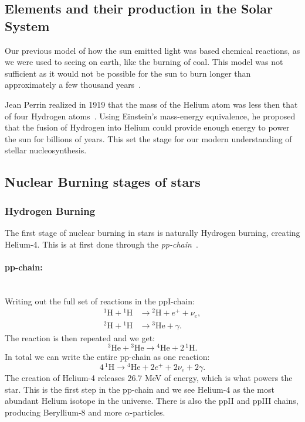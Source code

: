 \documentclass[english, notitlepage]{article}
\begin{document}
\subsection{Elements and their production in the Solar System}
Our previous model of how the sun emitted light was based chemical reactions, as we were used to seeing on earth, like the burning of coal. This model was not sufficient as it would not be possible for the sun to burn longer than approximately a few thousand years~\cite{gorgen:presentations}.

Jean Perrin realized in 1919 that the mass of the Helium atom was less then that of four Hydrogen atoms~\cite{gorgen:presentations}. Using Einstein's mass-energy equivalence, he proposed that the fusion of Hydrogen into Helium could provide enough energy to power the sun for billions of years. This set the stage for our modern understanding of stellar nucleosynthesis. 



\subsection{Nuclear Burning stages of stars}
\subsubsection{Hydrogen Burning}
The first stage of nuclear burning in stars is naturally Hydrogen burning, creating Helium-4. This is at first done through the \textit{pp-chain}~\cite{gorgen:presentations}. 

\paragraph{pp-chain:}\mbox{}\\
Writing out the full set of reactions in the ppI-chain:
\begin{align}
    {}^{1}\text{H} + {}^{1}\text{H} &\to {}^{2}\text{H} + e^{+} + \nu_{e},\\
    {}^{2}\text{H} + {}^{1}\text{H} &\to {}^{3}\text{He} + \gamma.
\end{align}
The reaction is then repeated and we get:
\begin{equation}
    {}^{3}\text{He} + {}^{3}\text{He} \to {}^{4}\text{He} + 2\,{}^{1}\text{H}.
\end{equation}
In total we can write the entire pp-chain as one reaction:
\begin{equation}\label{eq: pp-chain}
  4\,{}^{1}\text{H} \to {}^{4}\text{He} + 2e^{+} + 2\nu_{e} + 2\gamma.
\end{equation}
The creation of Helium-4 releases 26.7 MeV of energy, which is what powers the star. This is the first step in the pp-chain and we see Helium-4 as the most abundant Helium isotope in the universe. There is also the ppII and ppIII chains, producing Beryllium-8 and more $α$-particles. 
\end{document}

